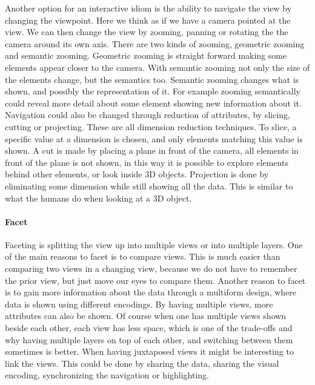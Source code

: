 \documentclass[Report.tex]{subfiles}
\begin{document}
Another option for an interactive idiom is the ability to navigate the view by changing the viewpoint. Here we think as if we have a camera pointed at the view. We can then change the view by zooming, panning or rotating the the camera around its own axis. There are two kinds of zooming, geometric zooming and semantic zooming. Geometric zooming is straight forward making some elements appear closer to the camera. With semantic zooming not only the size of the elements change, but the semantics too. Semantic zooming changes what is shown, and possibly the representation of it. For example zooming semantically could reveal more detail about some element showing new information about it.
Navigation could also be changed through reduction of attributes, by slicing, cutting or projecting. These are all dimension reduction techniques. To slice, a specific value at a dimension is chosen, and only elements matching this value is shown. A cut is made by placing a plane in front of the camera, all elements in front of the plane is not shown, in this way it is possible to explore elements behind other elements, or look inside 3D objects. Projection is done by eliminating some dimension while still showing all the data. This is similar to what the humans do when looking at a 3D object.
\paragraph{Facet\\}
Faceting is splitting the view up into multiple views or into multiple layers. One of the main reasons to facet is to compare views. This is much easier than comparing two views in a changing view, because we do not have to remember the prior view, but just move our eyes to compare them. Another reason to facet is to gain more information about the data through a multiform design, where data is shown using different encodings. By having multiple views, more attributes can also be shown. Of course when one has multiple views shown beside each other, each view has less space, which is one of the trade-offs and why having multiple layers on top of each other, and switching between them sometimes is better. When having juxtaposed views it might be interesting to link the views.  This could be done by sharing the data, sharing the visual encoding, synchronizing the navigation or highlighting. 
\end{document}
